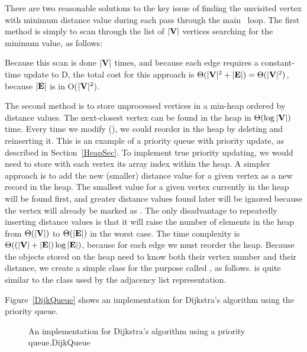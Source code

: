 There are two reasonable solutions to the key issue of finding the
unvisited vertex with minimum distance value during each pass through
the main \Cfor\ loop.
The first method is simply to scan through the list of \(|{\textbf{V}}|\)
vertices searching for the minimum value, as follows:


Because this scan is done \(|{\textbf{V}}|\) times, and because each edge
requires a constant-time update to D, the total cost for this approach
is \(\Theta(|{\textbf{V}}|^2 + |{\textbf{E}}|) = \Theta(|{\textbf{V}}|^2)\),
because \(|{\textbf{E}}|\) is in O(\(|{\textbf{V}}|^2\)).

The second method is to store unprocessed vertices in a
min-heap ordered by distance values.
The next-closest vertex can be found in the heap in
\(\Theta(\log |{\textbf{V}}|)\) time.
Every time we modify (), we could reorder  in
the heap by deleting and reinserting it.
This is an example of a priority queue with
priority update, as described in Section~\ref{HeapSec}.
To implement true priority updating, we would need to store with each
vertex its array index within the heap.
A simpler approach is to add the new (smaller) distance value
for a given vertex as a new record in the heap.
The smallest value for a given vertex currently in the heap will be
found first, and greater distance values found later will be ignored
because the vertex will already be marked as .
The only disadvantage to repeatedly inserting distance values is that
it will raise the number of elements in the heap from
\(\Theta(|{\textbf{V}}|)\) to \(\Theta(|{\textbf{E}}|)\) in the worst case.
The time complexity is
\(\Theta((|{\textbf{V}}| + |{\textbf{E}}|) \log |{\textbf{E}}|)\),
because for each edge we must reorder the heap.
Because the objects stored on the heap need to know both their vertex
number and their distance, we create a simple class for the purpose
called , as follows.
 is quite similar to the  class used by the
adjacency list representation.


Figure~\ref{DijkQueue} shows an implementation for Dijkstra's
algorithm using the priority queue.

\begin{figure}
\vspace{-\bigskipamount}
{An implementation for Dijkstra's algorithm using a priority
queue.}{DijkQueue}
\vspace{-\bigskipamount}
\end{figure}

